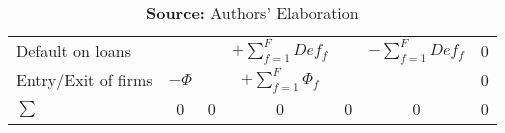 \begin{table*}[htb]
{\begin{tabular}{lcccccc}
Default on loans       &                              &                              & $+\sum_{f=1}^{F}Def_{f}$        &          & $-\sum_{f=1}^{F}Def_{f}$ & 0 \\
Entry/Exit of firms    & $-\Phi$                         &                              & $+\sum_{f=1}^{F}\Phi_{f}$          &          &                       & 0 \\ \hline
$\sum$                    & 0                            & 0                            & 0                            & 0        & 0                     & 0 \\
  \hline\hline
\end{tabular}%
}
\caption*{\textbf{Source:} Authors' Elaboration}
\end{table*}
